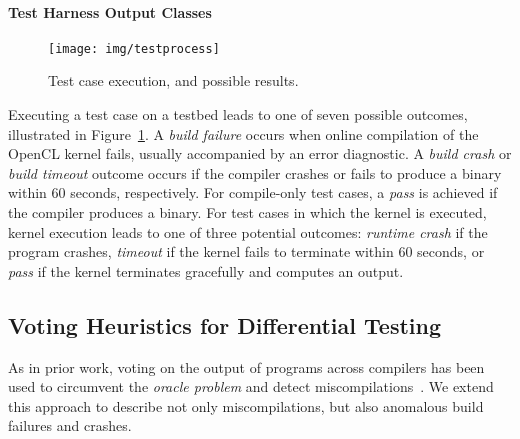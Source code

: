 \paragraph*{Test Harness Output Classes}
\begin{figure}
  \centering %
  \texttt{[image: img/testprocess]}%
  \caption{%
 	  Test case execution, and possible results.%
  }%
  \label{fig:test-process} %
\end{figure}
Executing a test case on a testbed leads to one of seven possible outcomes, illustrated in Figure~\ref{fig:test-process}. 
A \emph{build failure} occurs when online compilation of the OpenCL kernel fails, usually accompanied by an error diagnostic. 
A \emph{build crash} or \emph{build timeout} outcome occurs if the compiler crashes or fails to produce a binary within 60 seconds, respectively. 
For compile-only test cases, a \emph{pass} is achieved if the compiler produces a binary. 
For test cases in which the kernel is executed, kernel execution leads to one of three potential outcomes: 
\emph{runtime crash} if the program crashes, 
\emph{timeout} if the kernel fails to terminate within 60 seconds, 
or \emph{pass} if the kernel terminates gracefully and computes an output.

\subsection{Voting Heuristics for Differential Testing}

As in prior work, voting on the output of programs across compilers has been used to circumvent the \emph{oracle problem} and detect miscompilations~\cite{McKeeman1998}. We extend this approach to describe not only miscompilations, but also anomalous build failures and crashes.


%

